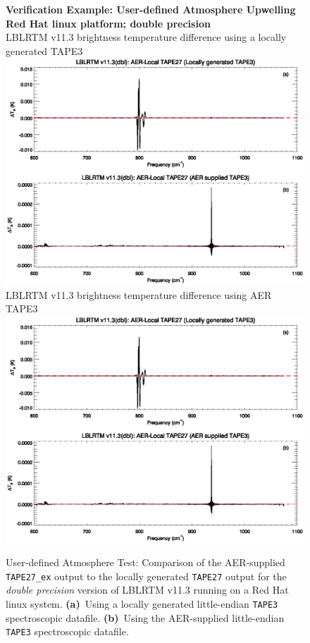 \begin{figure}[htp]
  \centering
  \qquad\sffamily\textbf{Verification Example: User-defined Atmosphere Upwelling}\\
  \qquad\sffamily\textbf{Red Hat linux platform; double precision}\\
  \qquad\textsf{LBLRTM v11.3 brightness temperature difference using a locally generated TAPE3}\\
  \includegraphics[bb=85 403 534 558,clip,scale=1.0]{graphics/run_example_user_defined_upwelling/dbl.eps}
  \qquad\textsf{LBLRTM v11.3 brightness temperature difference using AER TAPE3}\\
  \includegraphics[bb=85 226 534 381,clip,scale=1.0]{graphics/run_example_user_defined_upwelling/dbl.eps}
  \caption{User-defined Atmosphere Test: Comparison of the AER-supplied \texttt{TAPE27\_ex} output to the locally generated \texttt{TAPE27} output for the \textsl{double precision} version of LBLRTM v11.3 running on a Red Hat linux system. \mbox{\textbf{(a)} Using} a locally generated little-endian \texttt{TAPE3} spectroscopic datafile. \mbox{\textbf{(b)} Using} the AER-supplied little-endian \texttt{TAPE3} spectroscopic datafile.}
  \label{fig:run_example_user_defined_upwelling-dbl}
\end{figure}

